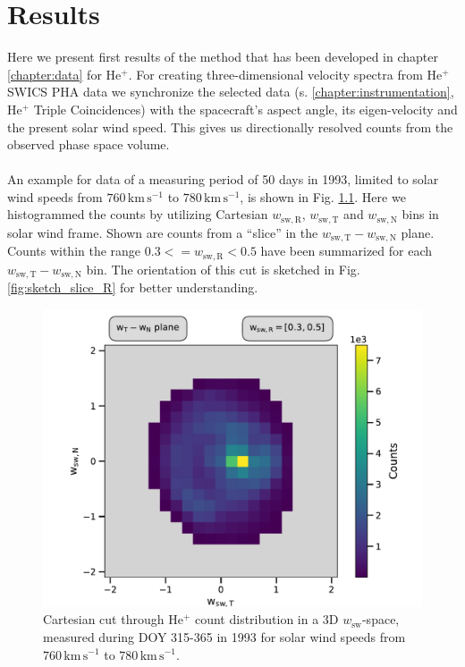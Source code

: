 
\chapter{Results} %
\label{chap:results}
%
%
%
Here we present first results of the method that has been developed in chapter \ref{chapter:data} for $\mathrm{He^{+}}$. For creating three-dimensional velocity spectra from $\mathrm{He^{+}}$ SWICS PHA data we synchronize the selected data (s. \ref{chapter:instrumentation}, $\mathrm{He^{+}}$ Triple Coincidences) with the spacecraft's aspect angle, its eigen-velocity and the present solar wind speed.
This gives us directionally resolved counts from the observed phase space volume.
\\ \\
An example for data of a measuring period of 50 days in 1993, limited to solar wind speeds from $760 \, \mathrm{km\,s^{-1}}$ to $780 \, \mathrm{km\,s^{-1}}$, is shown in Fig. \ref{fig:counts_50}. Here we histogrammed the counts by utilizing Cartesian $w_{\mathrm{sw,R}}$, $w_\mathrm{sw,T}$ and $w_\mathrm{sw,N}$ bins in solar wind frame. Shown are counts from a ``slice'' in the $w_\mathrm{sw,T} - w_\mathrm{sw,N}$ plane. Counts within the range $0.3 <= w_\mathrm{sw,R} < 0.5$ have been summarized for each $w_\mathrm{sw,T} - w_\mathrm{sw,N}$ bin. The orientation of this cut is sketched in Fig. \ref{fig:sketch_slice_R} for better understanding.\\
\begin{figure}[h]
	\includegraphics[width=.85\textwidth]{Figures/slice_50_counts.pdf}
	\centering
	\caption{Cartesian cut through $\mathrm{He^{+}}$ count distribution in a 3D $w_\mathrm{sw}$-space, measured during DOY 315-365 in 1993 for solar wind speeds from $760 \, \mathrm{km\,s^{-1}}$ to $780 \, \mathrm{km\,s^{-1}}$.}
	\label{fig:counts_50}
\end{figure}
